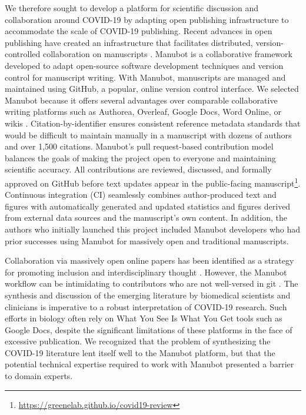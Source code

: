 \documentclass[twocolumn]{ceurart}
\begin{document}
We therefore sought to develop a platform for scientific discussion and collaboration around COVID-19 by adapting open publishing infrastructure to accommodate the scale of COVID-19 publishing.
Recent advances in open publishing have created an infrastructure that facilitates distributed, version-controlled collaboration on manuscripts \citep{YuJbg3zO}.
Manubot \citep{YuJbg3zO} is a collaborative framework developed to adapt open-source software development techniques and version control for manuscript writing.
With Manubot, manuscripts are managed and maintained using GitHub, a popular, online version control interface.
We selected Manubot because it offers several advantages over comparable collaborative writing platforms such as Authorea, Overleaf, Google Docs, Word Online, or wikis \citep{YuJbg3zO}.
Citation-by-identifier ensures consistent reference metadata standards that would be difficult to maintain manually in a manuscript with dozens of authors and over 1,500 citations.
Manubot's pull request-based contribution model balances the goals of making the project open to everyone and maintaining scientific accuracy.
All contributions are reviewed, discussed, and formally approved on GitHub before text updates appear in the public-facing manuscript\footnote{\url{https://greenelab.github.io/covid19-review}}.
Continuous integration (CI) seamlessly combines author-produced text and figures with automatically generated and updated statistics and figures derived from external data sources and the manuscript's own content.
In addition, the authors who initially launched this project included Manubot developers who had prior successes using Manubot for massively open and traditional manuscripts.

Collaboration via massively open online papers has been identified as a strategy for promoting inclusion and interdisciplinary thought \citep{PoDz2q0A}.
However, the Manubot workflow can be intimidating to contributors who are not well-versed in git \citep{PoDz2q0A}.
The synthesis and discussion of the emerging literature by biomedical scientists and clinicians is imperative to a robust interpretation of COVID-19 research.
Such efforts in biology often rely on What You See Is What You Get tools such as Google Docs, despite the significant limitations of these platforms in the face of excessive publication.
We recognized that the problem of synthesizing the COVID-19 literature lent itself well to the Manubot platform, but that the potential technical expertise required to work with Manubot presented a barrier to domain experts.
\end{document}
